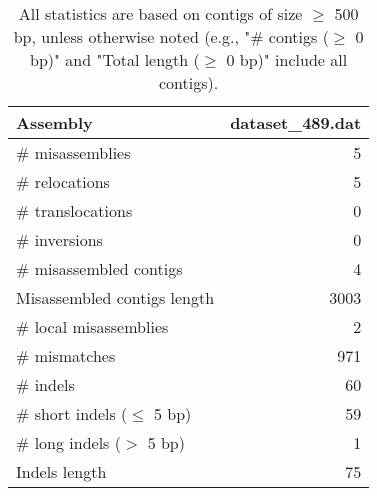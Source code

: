 \documentclass[12pt,a4paper]{article}
\begin{document}
\begin{table}[ht]
\begin{center}
\caption{All statistics are based on contigs of size $\geq$ 500 bp, unless otherwise noted (e.g., "\# contigs ($\geq$ 0 bp)" and "Total length ($\geq$ 0 bp)" include all contigs).}
\begin{tabular}{|l*{1}{|r}|}
\hline
Assembly & dataset\_489.dat \\ \hline
\# misassemblies & 5 \\ \hline
\hspace{5mm}\# relocations & 5 \\ \hline
\hspace{5mm}\# translocations & 0 \\ \hline
\hspace{5mm}\# inversions & 0 \\ \hline
\# misassembled contigs & 4 \\ \hline
Misassembled contigs length & 3003 \\ \hline
\# local misassemblies & 2 \\ \hline
\# mismatches & 971 \\ \hline
\# indels & 60 \\ \hline
\hspace{5mm}\# short indels ($\leq$ 5 bp) & 59 \\ \hline
\hspace{5mm}\# long indels ($>$ 5 bp) & 1 \\ \hline
Indels length & 75 \\ \hline
\end{tabular}
\end{center}
\end{table}
\end{document}
